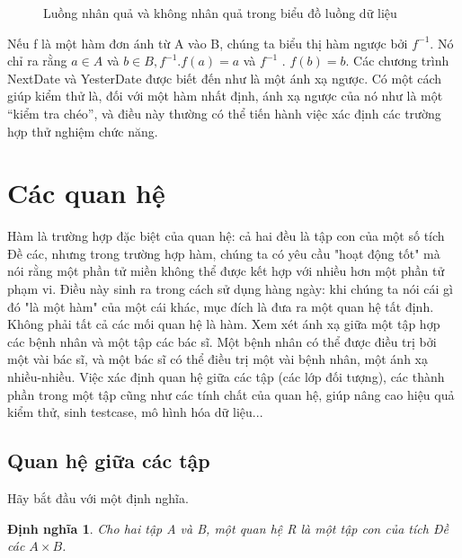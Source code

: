 \documentclass[11pt,a4paper,oneside]{article}
\newtheorem{modeling_def}{Định nghĩa }
\begin{document}
\begin{figure} [htb]
\setlength\fboxsep{1mm}
\setlength\fboxrule{1pt}
\begin{center}
\caption{Luồng nhân quả và không nhân quả trong biểu đồ luồng dữ liệu}
\label{fig:mtran_ima5}
\end{center}
\end{figure}

Nếu f là một hàm đơn ánh từ A vào B, chúng ta biểu thị hàm ngược bởi  $f^{-1}$. Nó chỉ ra rằng $ a \in A $ và $b \in B, f^{-1}. f\left(a\right) = a $ và $ f^{-1}$ . $f\left(b\right) = b. $ Các chương trình NextDate và YesterDate được biết đến như là một ánh xạ ngược. Có một cách giúp kiểm thử là, đối với một hàm nhất định, ánh xạ ngược của nó như là một “kiểm tra chéo”, và điều này thường có thể tiến hành việc xác định các trường hợp thử nghiệm chức năng.

\section{Các quan hệ}
Hàm là trường hợp đặc biệt của quan hệ: cả hai đều là tập con của một số tích Đề
các, nhưng trong trường hợp hàm, chúng ta có yêu cầu "hoạt động tốt" mà nói rằng
một phần tử miền không thể được kết hợp với nhiều hơn một phần tử phạm vi. Điều
này sinh ra trong cách sử dụng hàng ngày: khi chúng ta nói cái gì đó "là một
hàm" của một cái khác, mục đích là đưa ra một quan hệ tất định. Không phải tất
cả các mối quan hệ là hàm. Xem xét ánh xạ giữa một tập hợp các bệnh nhân và một
tập các bác sĩ. Một bệnh nhân có thể được điều trị bởi một vài bác sĩ, và một
bác sĩ có thể điều trị một vài bệnh nhân, một ánh xạ nhiều-nhiều. Việc xác định
quan hệ giữa các tập (các lớp đối tượng), các thành phần trong một tập cũng như
các tính chất của quan hệ, giúp nâng cao hiệu quả kiểm thử, sinh testcase, mô
hình hóa dữ liệu...

\subsection{Quan hệ giữa các tập}
Hãy bắt đầu với một định nghĩa.
\begin{modeling_def}
Cho hai tập A và B, một quan hệ R là một tập con của tích Đề các $ A \times B $.
\end{modeling_def}
\end{document}
